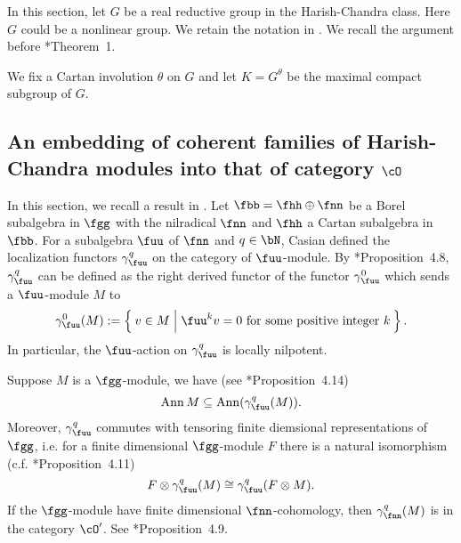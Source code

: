 \documentclass[counting_main.tex]{subfiles}
\begin{document}
In this section, let $G$ be a real reductive group in the Harish-Chandra class.
Here $G$ could be a nonlinear group.
We retain the notation in .
We recall the argument before \cite{Mc}*{Theorem~1}.

We fix a Cartan involution $\theta$ on $G$ and let $K = G^{\theta}$
be the maximal compact subgroup of $G$.



\subsection{An embedding of coherent families of Harish-Chandra modules into
  that of category $\cO$}
In this section, we recall a result in \cite{Cas}. Let $\fbb = \fhh\oplus \fnn$
be a Borel subalgebra in $\fgg$ with the nilradical $\fnn$ and $\fhh$ a Cartan
subalgebra in $\fbb$. For a subalgebra $\fuu$ of $\fnn$ and $q\in \bN$, Casian
defined the localization functors $\gamma_{\fuu}^{q}$ on the category of
$\fuu$-module. By \cite{Cas}*{Proposition~4.8}, $\gamma_{\fuu}^{q}$ can be
defined as the right derived functor of the functor $\gamma_{\fuu}^{0}$ which
sends a $\fuu$-module $M$ to
\[
  \gamma_{\fuu}^{0}(M):= \Set{v\in M| \fuu^{k} v = 0 \text{ for some positive
      integer $k$}}.
\]
In particular, the $\fuu$-action on $\gamma_{\fuu}^{q}$ is locally nilpotent.

Suppose $M$ is a $\fgg$-module, we have (see \cite{Cas}*{Proposition~4.14})
\begin{equation}\label{eq:anngamma}
  \Ann M \subseteq \Ann (\gamma_{\fuu}^{q}(M)).
\end{equation}
Moreover, $\gamma_{\fuu}^{q}$ commutes with tensoring finite diemsional
representations of $\fgg$, i.e. for a finite dimensional $\fgg$-module $F$ there
is a natural isomorphism (c.f. \cite{Cas}*{Proposition~4.11})
\begin{equation}\label{eq:Fgamma}
  F\otimes \gamma_{\fuu}^{q}(M)\cong
  \gamma_{\fuu}^{q}(F\otimes M).
\end{equation}
If the $\fgg$-module have finite dimensional $\fnn$-cohomology, then
$\gamma_{\fnn}^{q}(M)$ is in the category $\cO'$. See
\cite{Cas}*{Proposition~4.9}.
\end{document}
